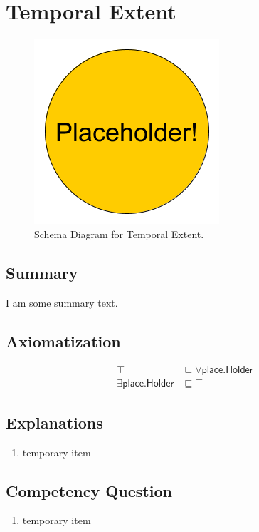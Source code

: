 \section{Temporal Extent}
\label{sec:Temporal}
\begin{figure}[h!]
\begin{center}
\includegraphics[width=.4\textwidth]{figures/placeholder}
\end{center}
\caption{Schema Diagram for Temporal Extent.}
\label{fig:Temporal}
\end{figure}
\subsection{Summary}
\label{sum:Temporal}
I am some summary text.

\subsection{Axiomatization}
\label{axs:Temporal}
\begin{align}
\top &\sqsubseteq \forall\textsf{place.Holder} \\ 
\exists\textsf{place.Holder} &\sqsubseteq \top 
\end{align}

\subsection{Explanations}
\label{exp:Temporal}
\begin{enumerate}
\item temporary item
\end{enumerate}

\subsection{Competency Question}
\label{cqs:Temporal}
\begin{enumerate}[CQ1.]
\item temporary item
\end{enumerate}

\newpage
